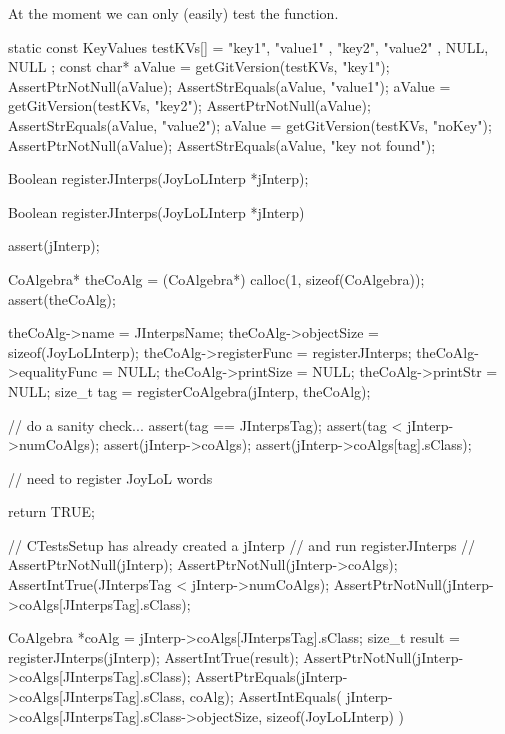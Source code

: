At the moment we can only (easily) test the  function.

\startCTest
  static const KeyValues testKVs[] = {
    { "key1", "value1" },
    { "key2", "value2" },
    { NULL,   NULL }
  };
  const char* aValue = getGitVersion(testKVs, "key1");
  AssertPtrNotNull(aValue);
  AssertStrEquals(aValue, "value1");
  aValue = getGitVersion(testKVs, "key2");
  AssertPtrNotNull(aValue);
  AssertStrEquals(aValue, "value2");
  aValue = getGitVersion(testKVs, "noKey");
  AssertPtrNotNull(aValue);
  AssertStrEquals(aValue, "key not found");
\stopCTest
\stopTestCase
\stopTestSuite

\startTestSuite[regiserJInterps]

\startCHeader
Boolean registerJInterps(JoyLoLInterp *jInterp);
\stopCHeader
{}

\startCCode
Boolean registerJInterps(JoyLoLInterp *jInterp) {
  assert(jInterp);
  
  CoAlgebra* theCoAlg    = (CoAlgebra*) calloc(1, sizeof(CoAlgebra));
  assert(theCoAlg);
  
  theCoAlg->name         = JInterpsName;
  theCoAlg->objectSize   = sizeof(JoyLoLInterp);
  theCoAlg->registerFunc = registerJInterps;
  theCoAlg->equalityFunc = NULL;
  theCoAlg->printSize    = NULL;
  theCoAlg->printStr     = NULL;
  size_t tag = registerCoAlgebra(jInterp, theCoAlg);
  
  // do a sanity check...
  assert(tag == JInterpsTag);
  assert(tag < jInterp->numCoAlgs);
  assert(jInterp->coAlgs);
  assert(jInterp->coAlgs[tag].sClass);
    
  // need to register JoyLoL words
  
  return TRUE;
}
\stopCCode


\startCTest
  // CTestsSetup has already created a jInterp 
  // and run registerJInterps
  //
  AssertPtrNotNull(jInterp);
  AssertPtrNotNull(jInterp->coAlgs);
  AssertIntTrue(JInterpsTag < jInterp->numCoAlgs);
  AssertPtrNotNull(jInterp->coAlgs[JInterpsTag].sClass);
  
  CoAlgebra *coAlg = jInterp->coAlgs[JInterpsTag].sClass;
  size_t result = registerJInterps(jInterp);
  AssertIntTrue(result);
  AssertPtrNotNull(jInterp->coAlgs[JInterpsTag].sClass);
  AssertPtrEquals(jInterp->coAlgs[JInterpsTag].sClass, coAlg);
  AssertIntEquals(
    jInterp->coAlgs[JInterpsTag].sClass->objectSize,
    sizeof(JoyLoLInterp)
  )
\stopCTest
\stopTestCase
\stopTestSuite
